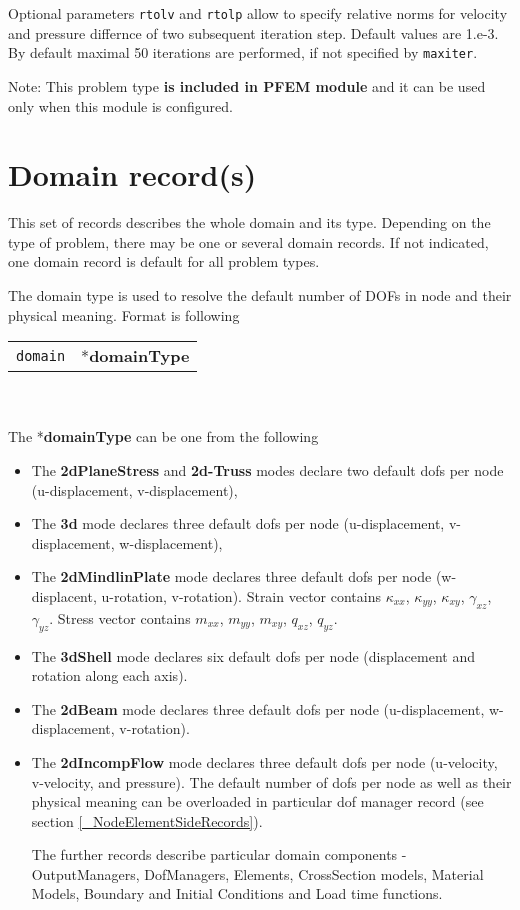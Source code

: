 \documentclass[a4paper]{report}
\newcommand{\param}[1]{\texttt{#1}} %
\newcommand{\fieldnotype}[1]{\param{#1}}
\newcommand{\entKeyword}[1]{*\textbf{#1}} %
\newcommand{\entKeywordInst}[1]{\textbf{#1}} %
\newenvironment{record}[1][]{\begin{tabular}{|ll}}{\end{tabular}\\}
\newcommand{\recentry}[2]{{#1}&{#2}\\}
\newcounter{rcc}
\newenvironment{record}[1][\textwidth]{\setcounter{rcc}{0}\rowcolors{1}{lightgray}{lightgray}\tabularx{#1}{llR} \hline}
               {\endtabularx}
\newcommand{\recentry}[2]{\ifthenelse{\value{rcc}>0}{$\backslash$ \\}{\setcounter{rcc}{1}}{#1}&{#2}&}
\begin{document}
Optional parameters \param{rtolv} and \param{rtolp} allow to
specify relative norms for velocity and pressure differnce of two subsequent iteration
step. Default values are 1.e-3. By default maximal 50 iterations are performed, if
not specified by \param{maxiter}.

Note: This problem type \textbf{is included in PFEM module} and it
can be used only when this module is configured.


\chapter{Domain record(s)}
\label{_DomainRecord}
This set of records describes the whole domain and its type. Depending
on the type of problem, there may be one or several domain records. If not
indicated, one domain record is default for all problem types.

The domain type is used to resolve the
default number of DOFs in node and their physical meaning. Format is following\\
\begin{record}
  \recentry{\fieldnotype{domain}}{\entKeyword{domainType}}
\end{record}\\
The \entKeyword{domainType} can be one from the following
\begin{itemize}
\item The \entKeywordInst{2dPlaneStress} and \entKeywordInst{2d-Truss}
modes declare two default dofs per node (u-displacement, v-displacement),
\item The \entKeywordInst{3d} mode declares three default dofs per
node (u-displacement, v-displacement, w-displacement),
\item The \entKeywordInst{2dMindlinPlate} mode declares three default
dofs per node (w-displacent, u-rotation, v-rotation). Strain vector contains
$\kappa_{xx}$, $\kappa_{yy}$, $\kappa_{xy}$, $\gamma_{xz}$, $\gamma_{yz}$. Stress vector
contains $m_{xx}$, $m_{yy}$, $m_{xy}$, $q_{xz}$, $q_{yz}$.

\item The \entKeywordInst{3dShell} mode declares six default dofs
per node (displacement and rotation along each axis).
\item The \entKeywordInst{2dBeam} mode declares three default dofs per
node (u-displacement, w-displacement, v-rotation).
\item The \entKeywordInst{2dIncompFlow} mode declares three default
  dofs per node (u-velocity, v-velocity, and pressure).
The default number of dofs per node as well as their physical meaning
can be overloaded in particular dof manager record (see section
\ref{_NodeElementSideRecords}).

The further records describe particular domain components -
OutputManagers, DofManagers, Elements, CrossSection models, Material
Models, Boundary and Initial Conditions and Load time functions.

\end{itemize}
\end{document}
